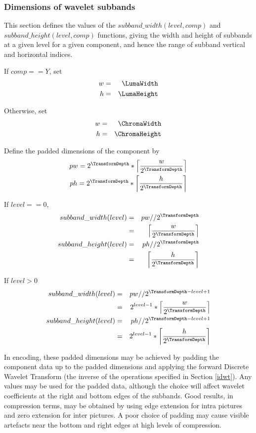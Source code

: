 \subsubsection{Dimensions of wavelet subbands}
\label{subbandwidthheight}

This section defines the values of the $subband\_width(level, comp)$ and $subband\_height(level,comp)$
functions, giving the width and height of subbands at a given level for a given component, and hence the range
of subband vertical and horizontal indices. 

If $comp==Y$, set
\begin{eqnarray*}
w & = & \LumaWidth \\
h & = & \LumaHeight
\end{eqnarray*}

Otherwise, set
\begin{eqnarray*}
w & = & \ChromaWidth \\
h & = & \ChromaHeight
\end{eqnarray*}

Define the padded dimensions of the component by
\begin{eqnarray*}
pw = 2^{\TransformDepth}*\left\lceil\frac{w}{2^{\TransformDepth}}\right\rceil\\ 
ph = 2^{\TransformDepth}*\left\lceil\frac{h}{2^{\TransformDepth}}\right\rceil
\end{eqnarray*}

If $level==0$,
\begin{eqnarray*}
subband\_width(level) & = & pw//2^{\TransformDepth} \\
& = & \left\lceil\frac{w}{2^{\TransformDepth}}\right\rceil \\
subband\_height(level) & = & ph//2^{\TransformDepth} \\
& = & \left\lceil\frac{h}{2^{\TransformDepth}}\right\rceil
\end{eqnarray*}

If $level>0$
\begin{eqnarray*}
subband\_width(level) & = & pw//2^{\TransformDepth-level+1} \\
& = & 2^{level-1}*\left\lceil \frac{w}{2^{\TransformDepth}}\right\rceil \\
subband\_height(level) & = & ph//2^{\TransformDepth-level+1} \\
& = & 2^{level-1}*\left\lceil\frac{h}{2^{\TransformDepth}}\right\rceil
\end{eqnarray*}

\begin{informative}
In encoding, these padded dimensions may be achieved by padding the 
component data up to the padded dimensions and applying the forward
Discrete Wavelet Transform (the inverse of the operations specified in
Section \ref{idwt}). Any values may be used for the padded data, although
the choice will affect wavelet coefficients at the right and bottom 
edges of the subbands. Good results, in compression terms, may be obtained
 by using edge extension for intra pictures and zero extension for inter 
pictures. A poor choice of padding may cause visible artefacts near the
bottom and right edges at high levels of compression.
\end{informative}

